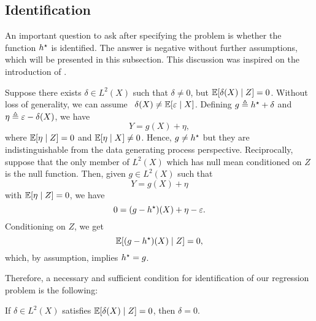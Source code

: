 \subsection{Identification}

An important question to ask after specifying the problem is whether the function $ h^{ \star } $ is identified.
The answer is negative without further assumptions, which will be presented in this subsection.
This discussion was inspired on the introduction of \cite{newey2003}.

Suppose there exists $ \delta \in L^{ 2 } ( X ) $ such that $ \delta \neq 0 $, but $ \mathbb{E} [ \delta ( X ) \mid Z ] = 0 $.
Without loss of generality, we can assume\footnotemark~ $ \delta ( X ) \neq \mathbb{E} [ \varepsilon \mid X ] $.
Defining $ g \triangleq h^{ \star } + \delta $ and $ \eta \triangleq \varepsilon - \delta ( X ) $, we have
\begin{equation*}
    Y = g ( X ) + \eta
,\end{equation*}
where $ \mathbb{E} [ \eta \mid Z ] = 0 $ and $ \mathbb{E} [ \eta \mid X ] \neq 0 $.
Hence, $ g \neq h^{ \star } $ but they are indistinguishable from the data generating process perspective.
Reciprocally, suppose that the only member of $ L^{ 2 } ( X ) $ which has null mean conditioned on $ Z $ is the null function.
Then, given $ g \in L^{ 2 } ( X ) $ such that
\begin{equation*}
    Y = g ( X ) + \eta
\end{equation*}
with $ \mathbb{E} [ \eta \mid Z ] = 0 $, we have
\begin{equation*}
    0 = ( g - h^{ \star } ) ( X ) + \eta - \varepsilon
.\end{equation*}
Conditioning on $ Z $, we get
\begin{equation*}
    \mathbb{E} [ ( g - h^{ \star } ) ( X ) \mid Z ] = 0
,\end{equation*}
which, by assumption, implies $ h^{ \star } = g $.

Therefore, a necessary and sufficient condition for identification of our regression problem is the following:
\begin{assump*}[Identification]
    If $ \delta \in L^{ 2 } ( X ) $ satisfies $ \mathbb{E} [ \delta ( X ) \mid Z ] = 0 $, then $ \delta = 0 $.
\end{assump*}
